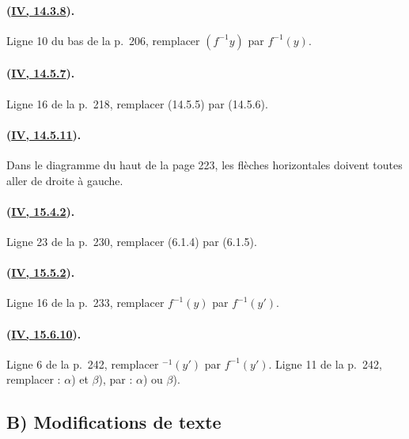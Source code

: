 \paragraph{({\texorpdfstring{\protect\hyperref[canon-index.ega4.c04.prop.14-3-8]{IV, 14.3.8}}{IV, 14.3.8}}).}
Ligne 10 du bas de la p.~206, remplacer $(f^{-1}y)$ par $f^{-1}(y)$.

\paragraph{({\texorpdfstring{\protect\hyperref[canon-index.ega4.c04.rem.14-5-7]{IV, 14.5.7}}{IV, 14.5.7}}).}
Ligne 16 de la p.~218, remplacer (14.5.5) par (14.5.6).

\paragraph{({\texorpdfstring{\protect\hyperref[canon-index.ega4.c04.cor.14-5-11]{IV, 14.5.11}}{IV, 14.5.11}}).}
Dans le diagramme du haut de la page 223, les flèches horizontales
doivent toutes aller de droite à gauche.

\paragraph{({\texorpdfstring{\protect\hyperref[canon-index.ega4.c04.prop.15-4-2]{IV, 15.4.2}}{IV, 15.4.2}}).}
Ligne 23 de la p.~230, remplacer (6.1.4) par (6.1.5).

\paragraph{({\texorpdfstring{\protect\hyperref[canon-index.ega4.c04.cor.15-5-2]{IV, 15.5.2}}{IV, 15.5.2}}).}
Ligne 16 de la p.~233, remplacer $f^{-1}(y)$ par $f^{-1}(y')$.

\paragraph{({\texorpdfstring{\protect\hyperref[canon-index.ega4.c04.item.15-6-10]{IV, 15.6.10}}{IV, 15.6.10}}).}
Ligne 6 de la p.~242, remplacer ${}^{-1}(y')$ par $f^{-1}(y')$.
Ligne 11 de la p.~242, remplacer : $\alpha$) et $\beta$), par :
$\alpha$) ou $\beta$).

\subsection*{B) Modifications de texte}

